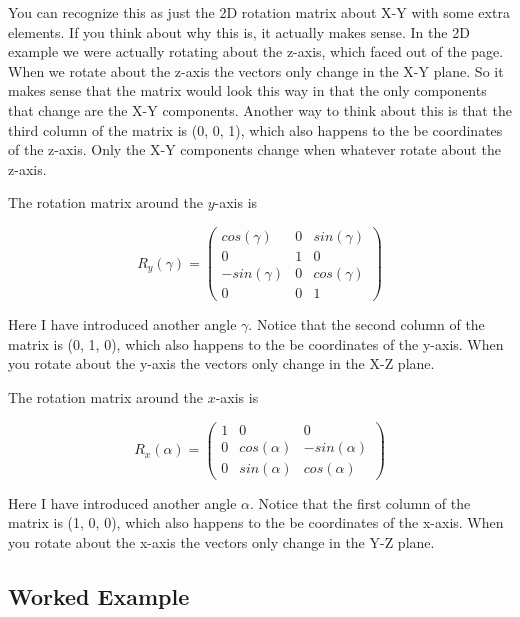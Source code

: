\documentclass[11pt]{article}
\begin{document}
You can recognize this as just the 2D rotation matrix about X-Y with some extra elements.
If you think about why this is, it actually makes sense.  In the 2D example we were
actually rotating about the z-axis, which faced out of the page.  When we rotate about
the z-axis the vectors only change in the X-Y plane.  So it makes sense that the matrix
would look this way in that the only components that change are the X-Y components.  Another
way to think about this is that the third column of the matrix is (0, 0, 1), which also
happens to the be coordinates of the z-axis.  Only the X-Y components change when whatever
rotate about the z-axis.

The rotation matrix around the \(y\)-axis is

\begin{equation}
    R_y(\gamma) = 
    \begin{pmatrix}
        cos(\gamma) & 0 & sin(\gamma) \\
        0 & 1 & 0 \\
        -sin(\gamma) & 0 & cos(\gamma) \\
        0 & 0 & 1
    \end{pmatrix}
\end{equation}

Here I have introduced another angle $\gamma$.  Notice that the second column of the matrix 
is (0, 1, 0), which also happens to the be coordinates of the y-axis.  When you rotate about
the y-axis the vectors only change in the X-Z plane.

The rotation matrix around the \(x\)-axis is

\begin{equation}
    R_x(\alpha) = 
    \begin{pmatrix}
        1 & 0 & 0 \\
        0 & cos(\alpha) & -sin(\alpha) \\
        0 & sin(\alpha) & cos(\alpha)
    \end{pmatrix}
\end{equation}

Here I have introduced another angle $\alpha$.  Notice that the first column of the matrix 
is (1, 0, 0), which also happens to the be coordinates of the x-axis.  When you rotate 
about the x-axis the vectors only change in the Y-Z plane.

\subsection{Worked Example}
\end{document}
